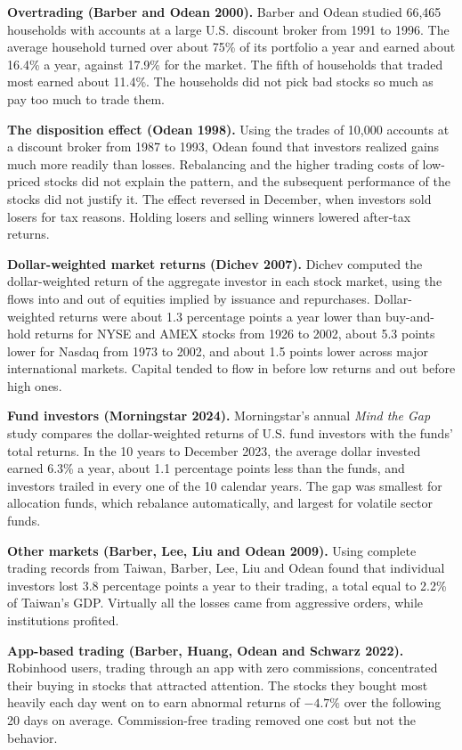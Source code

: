\textbf{Overtrading (Barber and Odean 2000).} Barber and Odean studied 66,465 households with accounts at a large U.S. discount broker from 1991 to 1996. The average household turned over about 75\% of its portfolio a year and earned about 16.4\% a year, against 17.9\% for the market. The fifth of households that traded most earned about 11.4\%. The households did not pick bad stocks so much as pay too much to trade them.

\textbf{The disposition effect (Odean 1998).} Using the trades of 10,000 accounts at a discount broker from 1987 to 1993, Odean found that investors realized gains much more readily than losses. Rebalancing and the higher trading costs of low-priced stocks did not explain the pattern, and the subsequent performance of the stocks did not justify it. The effect reversed in December, when investors sold losers for tax reasons. Holding losers and selling winners lowered after-tax returns.

\textbf{Dollar-weighted market returns (Dichev 2007).} Dichev computed the dollar-weighted return of the aggregate investor in each stock market, using the flows into and out of equities implied by issuance and repurchases. Dollar-weighted returns were about 1.3 percentage points a year lower than buy-and-hold returns for NYSE and AMEX stocks from 1926 to 2002, about 5.3 points lower for Nasdaq from 1973 to 2002, and about 1.5 points lower across major international markets. Capital tended to flow in before low returns and out before high ones.

\textbf{Fund investors (Morningstar 2024).} Morningstar's annual \emph{Mind the Gap} study compares the dollar-weighted returns of U.S. fund investors with the funds' total returns. In the 10 years to December 2023, the average dollar invested earned 6.3\% a year, about 1.1 percentage points less than the funds, and investors trailed in every one of the 10 calendar years. The gap was smallest for allocation funds, which rebalance automatically, and largest for volatile sector funds.

\textbf{Other markets (Barber, Lee, Liu and Odean 2009).} Using complete trading records from Taiwan, Barber, Lee, Liu and Odean found that individual investors lost 3.8 percentage points a year to their trading, a total equal to 2.2\% of Taiwan's GDP. Virtually all the losses came from aggressive orders, while institutions profited.

\textbf{App-based trading (Barber, Huang, Odean and Schwarz 2022).} Robinhood users, trading through an app with zero commissions, concentrated their buying in stocks that attracted attention. The stocks they bought most heavily each day went on to earn abnormal returns of $-4.7\%$ over the following 20 days on average. Commission-free trading removed one cost but not the behavior.

